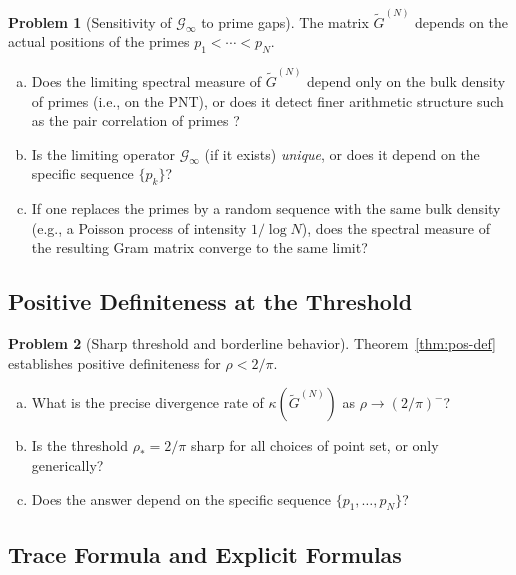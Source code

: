 \documentclass[12pt,a4paper]{amsart}
\theoremstyle{definition}
\newtheorem{problem}{Problem}[section]
\newcommand{\Gcinf}{\mathcal{G}_\infty}
\begin{document}
\begin{problem}[Sensitivity of $\Gcinf$ to prime gaps]
\label{prob:prime-gaps}
The matrix $\widetilde{G}^{(N)}$ depends on the actual positions
of the primes $p_1 < \cdots < p_N$.
\begin{enumerate}[(a)]
\item Does the limiting spectral measure of
$\widetilde{G}^{(N)}$ depend only on the bulk density of
primes (i.e., on the PNT), or does it detect finer
arithmetic structure such as the pair correlation of primes
\cite{GoldstonMontgomery1987}?
\item Is the limiting operator $\Gcinf$ (if it exists)
\emph{unique}, or does it depend on the specific sequence
$\{p_k\}$?
\item If one replaces the primes by a random sequence with
the same bulk density (e.g., a Poisson process of intensity
$1/\log N$), does the spectral measure of the resulting
Gram matrix converge to the same limit?
\end{enumerate}
\end{problem}

\subsection{Positive Definiteness at the Threshold}
\label{ssec:prob4}

\begin{problem}[Sharp threshold and borderline behavior]
\label{prob:threshold}
Theorem~\ref{thm:pos-def} establishes positive definiteness for
$\rho < 2/\pi$.
\begin{enumerate}[(a)]
\item What is the precise divergence rate of
$\kappa(\widetilde{G}^{(N)})$ as $\rho \to (2/\pi)^-$?
\item Is the threshold $\rho_* = 2/\pi$ sharp for all
choices of point set, or only generically?
\item Does the answer depend on the specific sequence
$\{p_1,\ldots,p_N\}$?
\end{enumerate}
\end{problem}

\subsection{Trace Formula and Explicit Formulas}
\label{ssec:prob5}
\end{document}

